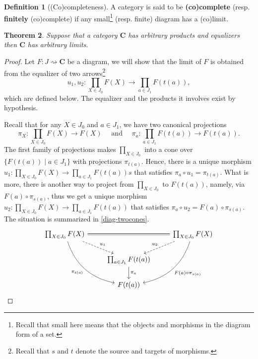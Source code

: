 \documentclass{article}
\newtheorem{thm}{Theorem}
\theoremstyle{definition}
\newtheorem{defn}[thm]{Definition}
\theoremstyle{remark}
\begin{document}
\begin{defn}[(Co)completeness]
    A category is said to be \textbf{(co)complete} (resp. \textbf{finitely} (co)complete) if any small\footnote{Recall that small here means that the objects and morphisms in the diagram form of a set.} (resp. finite) diagram has a (co)limit.
\end{defn}

\begin{thm}
    Suppose that a category $\mathbf{C}$ has arbitrary products and equalizers then $\mathbf{C}$ has arbitrary limits.
\end{thm}
\begin{proof}
    Let $F: J\rightsquigarrow \mathbf{C}$ be a diagram, we will show that the limit of $F$ is obtained from the equalizer of two arrows\footnote{Recall that $s$ and $t$ denote the source and targets of morphisms.}
    \[u_1, u_2: \prod_{X \in J_0} F(X) \rightarrow \prod_{a \in J_1} F(t(a)),\]
    which are defined below. The equalizer and the products it involves exist by hypothesis.
    
    Recall that for any $X \in J_0$ and $a \in J_1$, we have two  canonical projections \[\pi_X:\prod_{X \in J_0}F(X)\rightarrow F(X) \quad \text{ and }\quad \pi_a:\prod_{a \in J_1} F(t(a)) \rightarrow F(t(a)).\]
    The first family of projections makes $\prod_{X \in J_0}$ into a cone over $\{F(t(a)) \mid a \in J_1\}$ with projections $\pi_{t(a)}$. Hence, there is a unique morphism $u_1:\prod_{X \in J_0} F(X) \rightarrow \prod_{a \in J_1}F(t(a))s$ that satisfies $\pi_a \circ u_1 = \pi_{t(a)}$. What is more, there is another way to project from $\prod_{X \in J_0}$ to $F(t(a))$, namely, via $F(a) \circ \pi_{s(a)}$, thus we get a unique morphism $u_2:\prod_{X \in J_0} F(X) \rightarrow \prod_{a \in J_1}F(t(a))$ that satisfies $\pi_a \circ u_2 = F(a) \circ \pi_{s(a)}$. The situation is summarized in \eqref{diag-twocones}.
    \begin{equation}\label{diag-twocones}
        \begin{tikzcd}
            \prod_{X \in J_0} F(X) \arrow[rdd, "\pi_{t(a)}"', bend right] \arrow[rd, "u_1", dashed] \arrow[rr, equal] & & \prod_{X \in J_0} F(X) \arrow[ldd, "F(a) \circ \pi_{s(a)}", bend left] \arrow[ld, "u_2"', dashed] \\& \prod_{a \in J_1} F(t(a)) \arrow[d, "\pi_{a}"] &\\ & F(t(a)) &         
            \end{tikzcd}
    \end{equation}
    

\end{proof}
\end{document}
